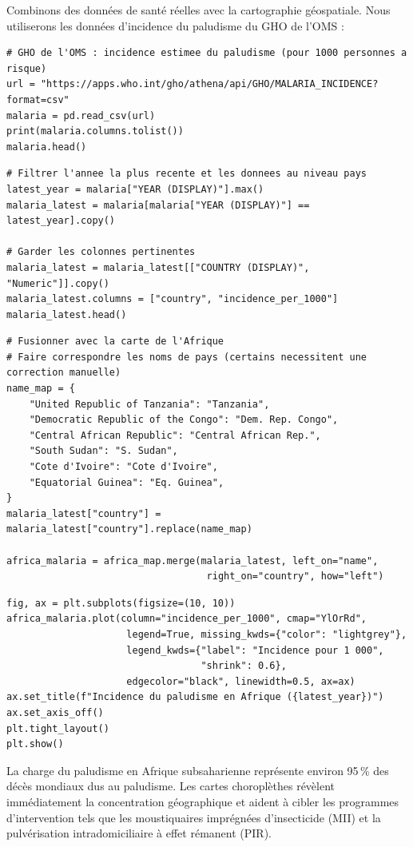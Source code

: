 Combinons des donn\'ees de sant\'e r\'eelles avec la cartographie g\'eospatiale. Nous utiliserons les donn\'ees d'incidence du paludisme du GHO de l'OMS :

\begin{verbatim}
# GHO de l'OMS : incidence estimee du paludisme (pour 1000 personnes a risque)
url = "https://apps.who.int/gho/athena/api/GHO/MALARIA_INCIDENCE?format=csv"
malaria = pd.read_csv(url)
print(malaria.columns.tolist())
malaria.head()
\end{verbatim}

\begin{verbatim}
# Filtrer l'annee la plus recente et les donnees au niveau pays
latest_year = malaria["YEAR (DISPLAY)"].max()
malaria_latest = malaria[malaria["YEAR (DISPLAY)"] == latest_year].copy()

# Garder les colonnes pertinentes
malaria_latest = malaria_latest[["COUNTRY (DISPLAY)", "Numeric"]].copy()
malaria_latest.columns = ["country", "incidence_per_1000"]
malaria_latest.head()
\end{verbatim}

\begin{verbatim}
# Fusionner avec la carte de l'Afrique
# Faire correspondre les noms de pays (certains necessitent une correction manuelle)
name_map = {
    "United Republic of Tanzania": "Tanzania",
    "Democratic Republic of the Congo": "Dem. Rep. Congo",
    "Central African Republic": "Central African Rep.",
    "South Sudan": "S. Sudan",
    "Cote d'Ivoire": "Cote d'Ivoire",
    "Equatorial Guinea": "Eq. Guinea",
}
malaria_latest["country"] = malaria_latest["country"].replace(name_map)

africa_malaria = africa_map.merge(malaria_latest, left_on="name",
                                   right_on="country", how="left")
\end{verbatim}

\begin{verbatim}
fig, ax = plt.subplots(figsize=(10, 10))
africa_malaria.plot(column="incidence_per_1000", cmap="YlOrRd",
                     legend=True, missing_kwds={"color": "lightgrey"},
                     legend_kwds={"label": "Incidence pour 1 000",
                                  "shrink": 0.6},
                     edgecolor="black", linewidth=0.5, ax=ax)
ax.set_title(f"Incidence du paludisme en Afrique ({latest_year})")
ax.set_axis_off()
plt.tight_layout()
plt.show()
\end{verbatim}

\begin{clinicalnote}
La charge du paludisme en Afrique subsaharienne repr\'esente environ 95\,\% des d\'ec\`es mondiaux dus au paludisme. Les cartes choropl\`ethes r\'ev\`elent imm\'ediatement la concentration g\'eographique et aident \`a cibler les programmes d'intervention tels que les moustiquaires impr\'egn\'ees d'insecticide (MII) et la pulv\'erisation intradomiciliaire \`a effet r\'emanent (PIR).
\end{clinicalnote}

